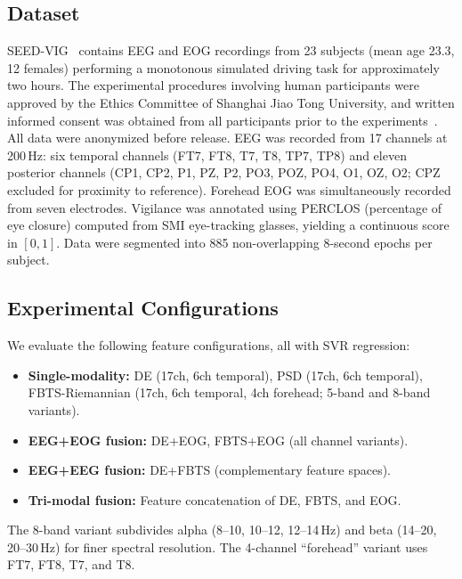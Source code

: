 \documentclass{iopjournal}
\begin{document}
\subsection{Dataset}

SEED-VIG~\cite{zheng2017multimodal} contains EEG and EOG recordings from 23 subjects (mean age 23.3, 12 females) performing a monotonous simulated driving task for approximately two hours. The experimental procedures involving human participants were approved by the Ethics Committee of Shanghai Jiao Tong University, and written informed consent was obtained from all participants prior to the experiments~\cite{zheng2017multimodal}. All data were anonymized before release. EEG was recorded from 17 channels at 200\,Hz: six temporal channels (FT7, FT8, T7, T8, TP7, TP8) and eleven posterior channels (CP1, CP2, P1, PZ, P2, PO3, POZ, PO4, O1, OZ, O2; CPZ excluded for proximity to reference). Forehead EOG was simultaneously recorded from seven electrodes. Vigilance was annotated using PERCLOS (percentage of eye closure) computed from SMI eye-tracking glasses, yielding a continuous score in $[0,1]$. Data were segmented into 885 non-overlapping 8-second epochs per subject.

\subsection{Experimental Configurations}

We evaluate the following feature configurations, all with SVR regression:

\begin{itemize}
  \item \textbf{Single-modality:} DE (17ch, 6ch temporal), PSD (17ch, 6ch temporal), FBTS-Riemannian (17ch, 6ch temporal, 4ch forehead; 5-band and 8-band variants).
  \item \textbf{EEG+EOG fusion:} DE+EOG, FBTS+EOG (all channel variants).
  \item \textbf{EEG+EEG fusion:} DE+FBTS (complementary feature spaces).
  \item \textbf{Tri-modal fusion:} Feature concatenation of DE, FBTS, and EOG.
\end{itemize}

The 8-band variant subdivides alpha (8--10, 10--12, 12--14\,Hz) and beta (14--20, 20--30\,Hz) for finer spectral resolution. The 4-channel ``forehead'' variant uses FT7, FT8, T7, and T8.
\end{document}
